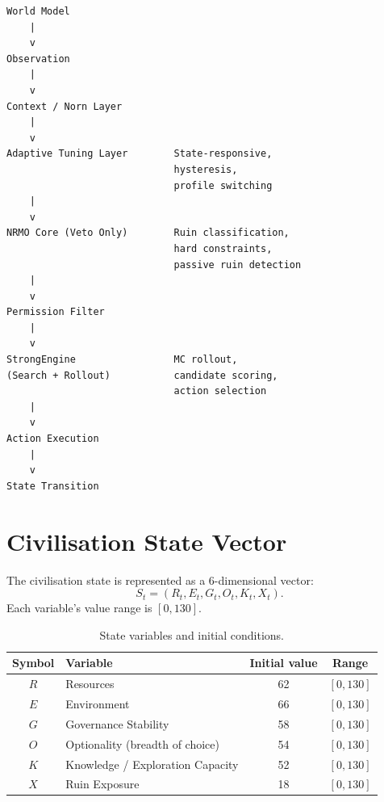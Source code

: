 \begin{lstlisting}[basicstyle=\ttfamily\scriptsize,frame=single]
World Model
    |
    v
Observation
    |
    v
Context / Norn Layer
    |
    v
Adaptive Tuning Layer        State-responsive,
                             hysteresis,
                             profile switching
    |
    v
NRMO Core (Veto Only)        Ruin classification,
                             hard constraints,
                             passive ruin detection
    |
    v
Permission Filter
    |
    v
StrongEngine                 MC rollout,
(Search + Rollout)           candidate scoring,
                             action selection
    |
    v
Action Execution
    |
    v
State Transition
\end{lstlisting}

\section{Civilisation State Vector}
\label{sec:vnext-state}

\begin{definition}
\label{def:vnext-state-vector}
The civilisation state is represented as a 6-dimensional vector:
\begin{equation}
S_t = (R_t, E_t, G_t, O_t, K_t, X_t).
\end{equation}
Each variable's value range is $[0, 130]$.
\end{definition}

\clearpage
\begin{table}[ht]
\centering
\small
\begin{tabularx}{\linewidth}{cXcc}
\toprule
\textbf{Symbol} & \textbf{Variable} & \textbf{Initial value} & \textbf{Range} \\
\midrule
$R$ & Resources & 62 & $[0, 130]$ \\
$E$ & Environment & 66 & $[0, 130]$ \\
$G$ & Governance Stability & 58 & $[0, 130]$ \\
$O$ & Optionality (breadth of choice) & 54 & $[0, 130]$ \\
$K$ & Knowledge / Exploration Capacity & 52 & $[0, 130]$ \\
$X$ & Ruin Exposure & 18 & $[0, 130]$ \\
\bottomrule
\end{tabularx}
\caption[Civilisation state variables]{State variables and initial
conditions.}
\label{tab:vnext-state-vars}
\end{table}

